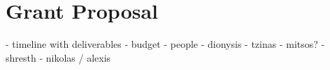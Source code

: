 \section{Grant Proposal}
- timeline with deliverables
    - budget
    - people
        - dionysis
        - tzinas
        - mitsos?
        - shresth
        - nikolas / alexis
